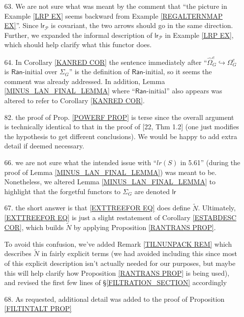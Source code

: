 \documentclass{article}
\begin{document}
\begin{itemize}
	\item[63.]
	We are not sure what was meant by the comment that
	``the picture in Example \ref{LRP EX} seems backward from
	Example \ref{REGALTERNMAP EX}''.
	Since $\mathsf{lr}_{\mathcal{P}}$
	is covariant, the two arrows should go in the same direction.
	Further, we expanded the informal description
	of $\mathsf{lr}_{\mathcal{P}}$
	in Example \ref{LRP EX},
	which should help clarify what this functor does.
	
	\item[64.]
	In Corollary \ref{KANRED COR} the sentence immediately after ``$\widehat{\Omega}^e_G \hookrightarrow \Omega^e_G$ is
	$\mathsf{Ran}$-initial over $\Sigma_G$''
	is the definition of $\mathsf{Ran}$-initial,
	so it seems the comment was already addressed.
	In addition, Lemma \ref{MINUS_LAN_FINAL_LEMMA} where ``$\mathsf{Ran}$-initial'' also appears was altered to refer to Corollary \ref{KANRED COR}.
	\item[82.] the proof of Prop. \ref{POWERF PROP} is terse since the overall argument is technically identical to that in the proof of [22, Thm 1.2] (one just modifies the hypothesis to get different conclusions).
	We would be happy to add extra detail if deemed necessary. 

	\item[66.] we are not sure what the intended issue with 
	``$lr(S)$ in 5.61'' 
	(during the proof of Lemma \ref{MINUS_LAN_FINAL_LEMMA})
	was meant to be.
	Nonetheless, we altered 
	Lemma \ref{MINUS_LAN_FINAL_LEMMA}
	to highlight that the forgetful functors to $\Sigma_G$
	are denoted $\mathsf{lr}$
	
	\item[67.] the short answer is that \eqref{EXTTREEFOR EQ} does define $\tilde{N}$.
	Ultimately, \eqref{EXTTREEFOR EQ} is just a slight restatement of Corollary \ref{ESTABDESC COR}, which builds 
	$\tilde{N}$ by applying Proposition \ref{RANTRANS PROP}.
	
	To avoid this confusion,
	we've added Remark \ref{TILNUNPACK REM} 
	which describes $\tilde{N}$ in fairly explicit terms
	(we had avoided including this since most of this explicit description isn't actually needed for our purposes,
	but maybe this will help clarify how 
	Proposition \ref{RANTRANS PROP} is being used),
	and revised the first few lines of 
	\S \ref{FILTRATION_SECTION} accordingly	

	
	\item[68.] As requested, additional detail was added to the proof of
	Proposition \ref{FILTINTALT PROP}


\end{itemize}
\end{document}
